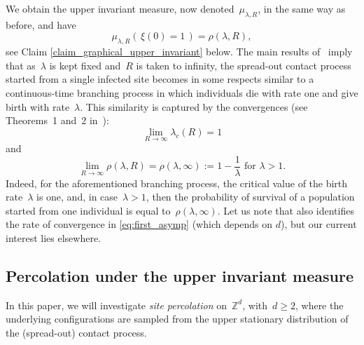 \documentclass[a4paper,12pt]{article}
\newcommand{\Z}{\mathbb{Z}}
\begin{document}
\smallskip

We obtain the upper invariant measure, now denoted~$\mu_{\lambda,R}$, in the same way as before, and have
\begin{equation}\label{eq:density}
\mu_{\lambda,R}( \, \xi(0)=1   \, ) = \rho(\lambda,R),
\end{equation}
see Claim \ref{claim_graphical_upper_invariant} below.
 The main results of~\cite{bds89} imply that as~$\lambda$ is kept fixed and~$R$ is taken to infinity, the spread-out contact process started from a single infected site becomes in some respects similar to a continuous-time branching process in which individuals die with rate one and give birth with rate~$\lambda$.
This similarity is captured by the convergences (see Theorems~1 and~2 in~\cite{bds89}):
\begin{equation}
\label{eq:first_asymp}
\lim_{R \to \infty} \lambda_c(R) = 1
\end{equation}
and
\begin{equation}
\label{eq:sec_asymp}
\lim_{R \to \infty} \rho(\lambda,R) = \rho(\lambda,\infty) := 1 - \frac{1}{\lambda} \text{ for }\lambda > 1.
\end{equation}
 Indeed, for the aforementioned branching process, the critical value of the birth rate~$\lambda$ is one, and, in case~$\lambda > 1$, then the probability of survival of a population started from one individual is equal to~$\rho(\lambda,\infty)$. Let us  note that \cite[Theorem 1]{bds89} also identifies the rate of convergence in \eqref{eq:first_asymp} (which depends on $d$), but our current interest lies elsewhere.

\subsection{Percolation under the upper invariant measure}
In this paper, we will investigate \textit{site percolation} on~$\Z^d$, with~$d \ge 2$, where the underlying configurations  are sampled from the upper stationary distribution of the (spread-out) contact process.

\smallskip
\end{document}
